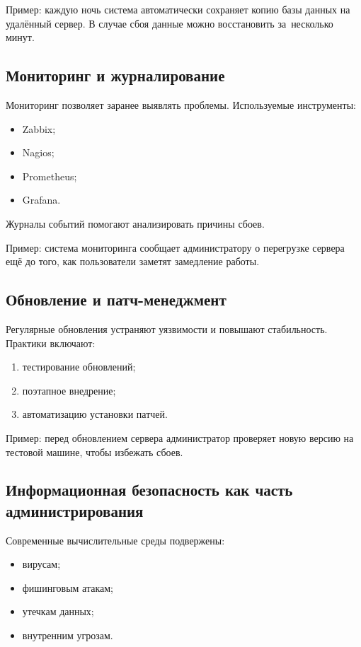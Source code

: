 \documentclass{ou}
\begin{document}
Пример: каждую ночь система автоматически сохраняет копию базы данных на удалённый сервер. В случае сбоя данные можно восстановить за~несколько минут.
\subsection{Мониторинг и журналирование}
	Мониторинг позволяет заранее выявлять проблемы. Используемые инструменты:
    \begin{itemize}[label=-, leftmargin=0em, itemindent=3.35em, nosep]
\item Zabbix;
\item Nagios;
\item Prometheus;
\item Grafana.
\end{itemize}

	Журналы событий помогают анализировать причины сбоев.
	
    Пример: система мониторинга сообщает администратору о перегрузке сервера ещё до того, как пользователи заметят замедление работы.
\subsection{Обновление и патч-менеджмент}
	Регулярные обновления устраняют уязвимости и повышают стабильность. Практики включают:
    \begin{enumerate}[leftmargin=0em, itemindent=3.75em, nosep, label=\arabic*)]
\item тестирование обновлений;
\item поэтапное внедрение;
\item автоматизацию установки патчей.
\end{enumerate}

	Пример: перед обновлением сервера администратор проверяет новую версию на тестовой машине, чтобы избежать сбоев.
\subsection{Информационная безопасность как часть администрирования}
	Современные вычислительные среды подвержены:
    \begin{itemize}[label=-, leftmargin=0em, itemindent=3.35em, nosep]
\item вирусам;
\item фишинговым атакам;
\item утечкам данных;
\item внутренним угрозам.
\end{itemize}
\end{document}
